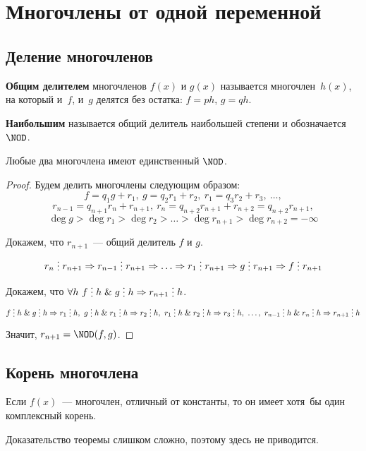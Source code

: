 \section{Многочлены от одной переменной}
\subsection{Деление многочленов}
\textbf{Общим делителем} многочленов $f(x)$ и $g(x)$ называется многочлен~$h(x)$, на который и~$f$, и~$g$ делятся без остатка: $f = ph$, $g = qh$.

\textbf{Наибольшим} называется общий делитель наибольшей степени и обозначается $\NOD$.

\begin{theorem}
Любые два многочлена имеют единственный $\NOD$.
\end{theorem}
\begin{proof}
Будем делить многочлены следующим образом:
\begin{equation*}
f = q_1 g + r_1, \
g = q_2 r_1 + r_2, \
r_1 = q_3 r_2 + r_3, \ \ldots,
\end{equation*}
\begin{equation*}
r_{n-1} = q_{n+1} r_n + r_{n+1}, \
r_n = q_{n+2} r_{n+1} + r_{n+2} = q_{n+2} r_{n+1},
\end{equation*}
\begin{equation*}
\deg g > \deg r_1 > \deg r_2 > \ldots > \deg r_{n+1} > \deg r_{n+2} = -\infty
\end{equation*}

Докажем, что $r_{n+1}$~--- общий делитель $f$ и $g$.
\begin{equation*}
r_n \mult r_{n+1} \Rightarrow
r_{n-1} \mult r_{n+1} \Rightarrow
\ldots \Rightarrow
r_1 \mult r_{n+1} \Rightarrow
g \mult r_{n+1} \Rightarrow
f \mult r_{n+1}
\end{equation*}

Докажем, что $\forall h \ f \mult h \lAnd g \mult h \Rightarrow r_{n+1} \mult h$.
\begin{equation*}
f \mult h \lAnd g \mult h \Rightarrow r_1 \mult h, \
g \mult h \lAnd r_1 \mult h \Rightarrow r_2 \mult h, \
r_1 \mult h \lAnd r_2 \mult h \Rightarrow r_3 \mult h, \ \ldots, \
r_{n-1} \mult h \lAnd r_n \mult h \Rightarrow r_{n+1} \mult h
\end{equation*}

Значит, $r_{n+1} = \NOD(f, g)$.
\end{proof}

\subsection{Корень многочлена}
\begin{theorem}[основная теорема алгебры]
\label{th:fundamental_th_of_algebra}
Если $f(x)$~--- многочлен, отличный от константы, то он имеет хотя~бы один комплексный корень.
\end{theorem}%
Доказательство теоремы слишком сложно, поэтому здесь не приводится.

